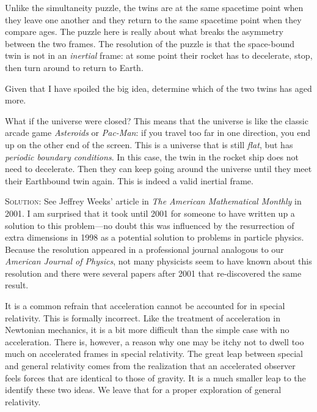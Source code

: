 \documentclass[12pt, oneside]{report}    %
\begin{document}
Unlike the simultaneity puzzle, the twins are at the same spacetime point when they leave one another and they return to the same spacetime point when they compare ages.
The puzzle here is really about what breaks the asymmetry between the two frames. The resolution of the puzzle is that the space-bound twin is not in an \emph{inertial} frame: at some point their rocket has to decelerate, stop, then turn around to return to Earth. 
\begin{exercise}
Given that I have spoiled the big idea, determine which of the two twins has aged more.
\end{exercise}
\begin{exercise}
What if the universe were closed? This means that the universe is like the classic arcade game \emph{Asteroids} or \emph{Pac-Man}: if you travel too far in one direction, you end up on the other end of the screen. This is a universe that is still \emph{flat}, but has \emph{periodic boundary conditions}. In this case, the twin in the rocket ship does not need to decelerate. Then they can keep going around the universe until they meet their Earthbound twin again. This is indeed a valid inertial frame.

\textsc{Solution}: See Jeffrey Weeks' article in \emph{The American Mathematical Monthly} in 2001.\autocite{weeks:twin:doi:10.1080/00029890.2001.11919789} I am surprised that it took until 2001 for someone to have written up a solution to this problem---no doubt this was influenced by the resurrection of extra dimensions in 1998 as a potential solution to problems in particle physics. Because the resolution appeared in a professional journal analogous to our \emph{American Journal of Physics}, not many physicists seem to have known about this resolution and there were several papers after 2001 that re-discovered the same result.
\end{exercise}

It is a common refrain that acceleration cannot be accounted for in special relativity. This is formally incorrect. Like the treatment of acceleration in Newtonian mechanics, it is a bit more difficult than the simple case with no acceleration. There is, however, a reason why one may be itchy not to dwell too much on accelerated frames in special relativity. The great leap between special and general relativity comes from the realization that an accelerated observer feels forces that are identical to those of gravity. It is a much smaller leap to the identify these two ideas. We leave that for a proper exploration of general relativity.
\end{document}

